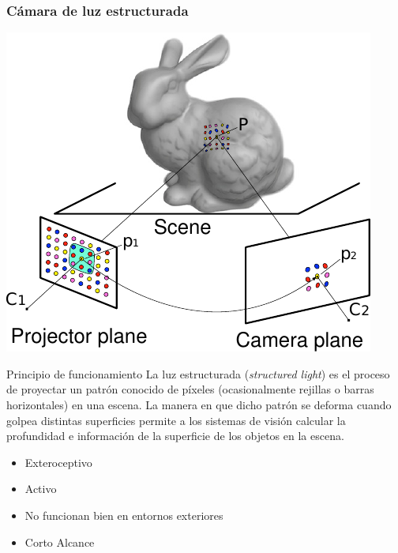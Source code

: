 \begin{frame}
    \frametitle{Cámara de luz estructurada}
    \scriptsize
    \begin{center}
        \includegraphics[width=0.3\columnwidth]{images/structured_light.pdf}
    \end{center}

    \begin{block}{Principio de funcionamiento}
        La luz estructurada (\emph{structured light}) es el proceso de proyectar un patrón conocido de píxeles (ocasionalmente rejillas o barras horizontales) en una escena. La manera en que dicho patrón se deforma cuando golpea distintas superficies permite a los sistemas de visión calcular la profundidad e información de la superficie de los objetos en la escena.
    \end{block}

    \begin{itemize}
        \item Exteroceptivo
        \item Activo
        \item No funcionan bien en entornos exteriores
        \item Corto Alcance
    \end{itemize}

\end{frame}